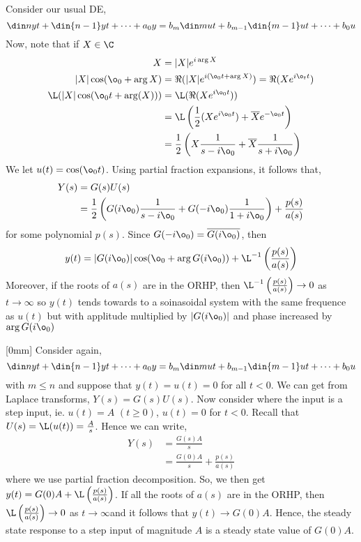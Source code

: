 Consider our usual DE,
$$ \din n y t + \din {n-1} y t + \dots + a_0y = b_m\din m u t + b_{m-1}\din {m-1} u t + \dots + b_0u$$
Now, note that if $X \in \C$
\begin{align*}
  X &= |X| e^{i \arg{X}}\\
  |X|\cos (\o_0 + \arg X) &= \Re (|X|e^{i (\o_0t + \arg X)}) = \Re (Xe^{i\o_t t})\\
  \L(|X|\cos (\o_0 t + \arg(X))) &= \L(\Re (Xe^{i \o_0 t})) \\
  &= \L\left(\frac{1}{2} (Xe^{i\o_0 t}) + \overline{X} e^{-\o_0 t}\right) \\
  &= \frac{1}{2} \left(X \frac{1}{s - i\o_0} + \overline{X} \frac{1}{s + i\o_0}\right)
\end{align*}
We let $u(t) = \cos (\o_0 t)$. Using partial fraction expansions, it follows that,
\begin{align*}
  Y(s) &= G(s)U(s)\\
  &= \frac{1}{2}\left(G(i\o_0) \frac{1}{s - i\o_0} + G(-i\o_0)\frac{1}{1 + i\o_0}\right) + \frac{p(s)}{a(s)}
\end{align*}
for some polynomial $p(s)$. Since $G(-i\o_0) = \overline{G(i\o_0)}$, then
$$ y(t) = |G(i\o_0)|\cos (\o_0 + \arg G(i\o_0)) + \L^{-1} \left( \frac{p(s)}{a(s)} \right) $$
Moreover, if the roots of $a(s)$ are in the ORHP, then $\L^{-1} \left( \frac{p(s)}{a(s)} \right) \to 0$ as $t \to \infty$ so $y(t)$ tends towards to a soinasoidal system with the same frequence as $u(t)$ but with applitude multiplied by $|G(i\o_0)|$ and phase increased by $\arg G(i\o_0)$

[0mm]
Consider again,
$$ \din n y t + \din {n-1} y t + \dots + a_0y = b_m\din m u t + b_{m-1}\din {m-1} u t + \dots + b_0u$$
with $m \le n$ and suppose that $y(t) = u(t) = 0$ for all $t < 0$. We can get from Laplace transforms, $Y(s) = G(s)U(s)$.
Now consider where the input is a step input, ie. $u(t) = A$ $(t\ge 0)$, $u(t)=0 $ for $t < 0$. Recall that $U(s)=\L(u(t)) = \frac{A}{s}$. Hence we can write,
\begin{align*}
  Y(s) &= \frac{G(s)A}{s}\\
  &= \frac{G(0)A}{s} + \frac{p(s)}{a(s)}
\end{align*}
where we use partial fraction decomposition. So, we then get $y(t) = G(0)A + \L\left(\frac{p(s)}{a(s)} \right)$. If all the roots of $a(s)$ are in the ORHP, then $\L\left(\frac{p(s)}{a(s)}\right) \to 0$ as $t \to \infty$and it follows that $y(t) \to G(0)A$. Hence, the steady state response to a step input of magnitude $A$ is a steady state value of $G(0)A$.\\

